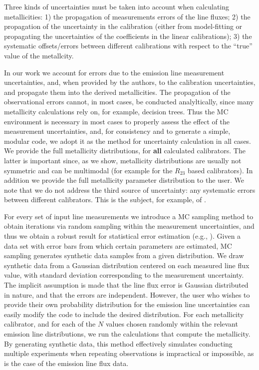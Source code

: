 \documentclass{emulateapj} \usepackage{amsmath} \usepackage{float}
\begin{document}
Three kinds of uncertainties must be taken into account when calculating metallicities:
1) the propagation of  measurements errors of the line fluxes; 
2) the propagation of the uncertainty in the calibration 
(either from model-fitting or propagating the
uncertainties of the coefficients in the linear calibrations); 
3) the systematic offsets/errors between different calibrations with respect
to the ``true'' value of the metallcity.

In our work we account for errors due to
 the emission
line measurement uncertainties, and, when provided by the authors, to the calibration
uncertainties, and propagate them into the derived metallicities. The propagation of the
observational errors cannot, in most cases, be conducted analyltically, 
since many metallicity
calculations rely on, for example, decision trees. Thus the MC environment is
necessary in most cases to properly assess the effect of the measurement
uncertainties, and, for consistency and to generate a simple, modular code, 
we adopt it as the method for uncertainty
calculation in all cases. 
We provide the
full metallicity distributions, for \textbf{all} calculated
calibrators. The latter is important since, as we show, metallicity
distributions are usually not symmetric and can be multimodal (for example for the $R_{23}$ based calibrators). In addition we provide
the full metallicity parameter distribution to the user. We note that
we do not address the third source of uncertainty: any systematic errors between
different calibrators. This is the subject, for example, of
\citet{lopezsanchez12}.  

For every set of input line measurements we introduce a MC sampling
method to obtain iterations via random sampling within the measurement
uncertainties, and thus we obtain a robust result for statistical
error estimation (e.g., \citealt{efron79,hastie09,andrae10}).  Given a
data set with error bars from which certain parameters are estimated,
MC sampling generates synthetic data samples from a given
distribution. We draw synthetic data from a Gaussian distribution
centered on each measured line flux value, with standard deviation
corresponding to the measurement uncertainty. The implicit assumption
is made that the line flux error is Gaussian distributed in nature,
and that the errors are independent. However, the user who wishes to
provide their own probability distribution for the emission line
uncertainties can easily modify the code to include the desired
distribution.  For each metallicity calibrator, and for each of the
$N$ values chosen randomly within the relevant emission line
distributions, we run the calculations that compute the metallicity.
By generating synthetic data, this method effectively simulates
conducting multiple experiments when repeating observations is
impractical or impossible, as is the case of the emission line flux
data.
\end{document}
